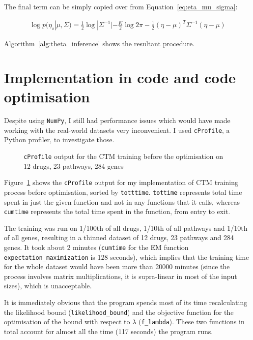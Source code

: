 \documentclass[12pt,a4paper,twoside,openright]{report}
\begin{document}
The final term can be simply copied over from Equation~\ref{eq:eta_mu_sigma}:

\begin{align}
\log p(\eta_s | \mu, \Sigma) = \frac{1}{2} \log |\Sigma^{-1}| - \frac{K}{2} \log 2 \pi - \frac{1}{2}(\eta - \mu)^T\Sigma^{-1}(\eta - \mu)
\end{align}

Algorithm~\ref{alg:theta_inference} shows the resultant procedure.



\section{Implementation in code and code optimisation}

Despite using \texttt{NumPy}, I still had performance issues which would have made working with the real-world datasets very inconvenient. I used \texttt{cProfile}, a Python profiler, to investigate those.

\begin{figure}
\caption{\texttt{cProfile} output for the CTM training before the optimisation on 12 drugs, 23 pathways, 284 genes}
\label{fig:ctm-profile-before}
\end{figure}

Figure~\ref{fig:ctm-profile-before} shows the \texttt{cProfile} output for my implementation of CTM training process before optimisation, sorted by \texttt{totttime}. \texttt{tottime} represents total time spent in just the given function and not in any functions that it calls, whereas \texttt{cumtime} represents the total time spent in the function, from entry to exit.

The training was run on 1/100th of all drugs, 1/10th of all pathways and 1/10th of all genes, resulting in a thinned dataset of 12 drugs, 23 pathways and 284 genes. It took about 2 minutes (\texttt{cumtime} for the EM function \texttt{expectation\_maximization} is 128 seconds), which implies that the training time for the whole dataset would have been more than 20000 minutes (since the process involves matrix multiplications, it is supra-linear in most of the input sizes), which is unacceptable.

It is immediately obvious that the program spends most of its time recalculating the likelihood bound (\texttt{likelihood\_bound}) and the objective function for the optimisation of the bound with respect to $\lambda$ (\texttt{f\_lambda}). These two functions in total account for almost all the time (117 seconds) the program runs.
\end{document}
